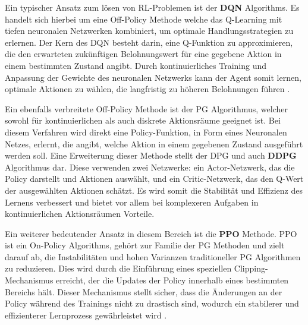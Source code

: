 \documentclass[twocolumn]{webofc}
\begin{document}
Ein typischer Ansatz zum lösen von \ac{RL}-Problemen ist der \textbf{\ac{DQN}} Algorithms. Es handelt sich hierbei um eine Off-Policy Methode welche das Q-Learning mit tiefen neuronalen Netzwerken kombiniert, um optimale Handlungsstrategien zu erlernen. Der Kern des \ac{DQN} besteht darin, eine Q-Funktion zu approximieren, die den erwarteten zukünftigen Belohnungswert für eine gegebene Aktion in einem bestimmten Zustand angibt. %
Durch kontinuierliches Training und Anpassung der Gewichte des neuronalen Netzwerks kann der Agent somit lernen, optimale Aktionen zu wählen, die langfristig zu höheren Belohnungen führen \cite{mnih2013}.

Ein ebenfalls verbreitete Off-Policy Methode ist der \ac{PG} Algorithmus, welcher sowohl für kontinuierlichen als auch diskrete Aktionsräume geeignet ist. Bei diesem Verfahren wird direkt eine Policy-Funktion, in Form eines Neuronalen Netzes, erlernt, die angibt, welche Aktion in einem gegebenen Zustand ausgeführt werden soll.
Eine Erweiterung dieser Methode stellt der \ac{DPG} und auch \textbf{\ac{DDPG}} Algorithmus dar. Diese verwenden zwei Netzwerke: ein Actor-Netzwerk, das die Policy darstellt und Aktionen auswählt, und ein Critic-Netzwerk, das den Q-Wert der ausgewählten Aktionen schätzt. Es wird somit die Stabilität und Effizienz des Lernens verbessert und bietet vor allem bei komplexeren Aufgaben in kontinuierlichen Aktionsräumen Vorteile. 

Ein weiterer bedeutender Ansatz in diesem Bereich ist die \textbf{\ac{PPO}} Methode. \ac{PPO} ist ein On-Policy Algorithms, gehört zur Familie der \ac{PG} Methoden und zielt darauf ab, die Instabilitäten und hohen Varianzen traditioneller \ac{PG} Algorithmen zu reduzieren. Dies wird durch die Einführung eines speziellen Clipping-Mechanismus erreicht, der die Updates der Policy innerhalb eines bestimmten Bereichs hält. Dieser Mechanismus stellt sicher, dass die Änderungen an der Policy während des Trainings nicht zu drastisch sind, wodurch ein stabilerer und effizienterer Lernprozess gewährleistet wird \cite{SchulmanWDRK17}.
\end{document}
